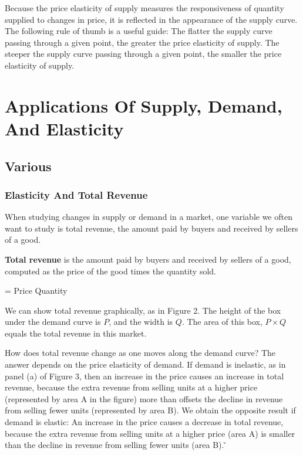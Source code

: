 Because the price elasticity of supply measures the responsiveness of quantity supplied to changes in price, it is
reflected in the appearance of the supply curve. The following rule of thumb is a useful guide: The flatter the
supply curve passing through a given point, the greater the price elasticity of supply. The steeper the supply curve
passing through a given point, the smaller the price elasticity of supply.

\section{Applications Of Supply, Demand, And Elasticity}

\subsection{Various}

\subsubsection*{Elasticity And Total Revenue}

When studying changes in supply or demand in a market, one variable we often want to study is total revenue, the
amount paid by buyers and received by sellers of a good.

\textbf{Total revenue} is the amount paid by buyers and received by sellers of a good, computed as the price of the good
times the quantity sold.

\bse
{} = Price \times Quantity
\ese
\ed

We can show total revenue graphically, as in Figure 2. The height of the box under the demand curve is $P$, and the
width is $Q$. The area of this box, $P \times Q$ equals the total revenue in this market.


How does total revenue change as one moves along the demand curve? The answer depends on the price elasticity of
demand. If demand is inelastic, as in panel (a) of Figure 3, then an increase in the price causes an increase in
total revenue, because the extra revenue from selling units at a higher price (represented by area A in the figure)
more than offsets the decline in revenue from selling fewer units (represented by area B). We obtain the opposite
result if demand is elastic: An increase in the price causes a decrease in total revenue, because the extra revenue
from selling units at a higher price (area A) is smaller than the decline in revenue from selling fewer units (area
B). \v

